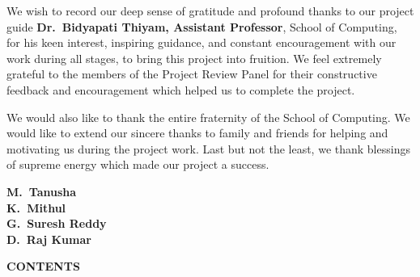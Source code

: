 \documentclass[12pt,a4paper]{report}
\begin{document}
We wish to record our deep sense of gratitude and profound thanks to our project guide \textbf{\color{amritared}Dr.~Bidyapati Thiyam, Assistant Professor}, School of Computing, for his keen interest, inspiring guidance, and constant encouragement with our work during all stages, to bring this project into fruition. We feel extremely grateful to the members of the Project Review Panel for their constructive feedback and encouragement which helped us to complete the project.

We would also like to thank the entire fraternity of the School of Computing. We would like to extend our sincere thanks to family and friends for helping and motivating us during the project work. Last but not the least, we thank blessings of supreme energy which made our project a success.

\vspace{2.2cm}
\begin{flushright}
\textbf{M.~Tanusha \quad [AV.SC.U4AIE23030]}\\[6pt]
\textbf{K.~Mithul \quad [AV.SC.U4AIE23025]}\\[6pt]
\textbf{G.~Suresh Reddy \quad [AV.SC.U4AIE23014]}\\[6pt]
\textbf{D.~Raj Kumar \quad [AV.SC.U4AIE23010]}
\end{flushright}
\clearpage

\thispagestyle{plain}
\begin{center}
    {\fontsize{14}{17}\selectfont \textbf{CONTENTS}}\\[10pt]
\end{center}
\end{document}
